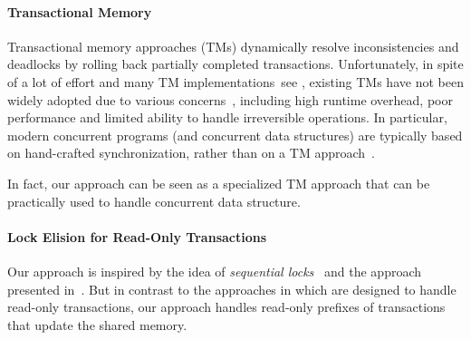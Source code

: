 \paragraph{Transactional Memory}
Transactional memory approaches (TMs) dynamically resolve inconsistencies
and deadlocks by rolling back partially completed transactions.
%
Unfortunately, in spite of a lot of effort and many TM implementations~see \cite{HLR:SLCA2010}, existing TMs
have not been widely adopted due to various concerns~\cite{DuffyTM2010,Cascaval:2008,mckenneyParallel}, including high runtime overhead,
poor performance and limited ability to handle irreversible operations.
In particular, modern concurrent programs (and concurrent data structures) are typically based on hand-crafted synchronization, rather than  on a TM approach~\cite{Ohad:OOPSLA11}.
 
In fact, our approach can be seen as a specialized TM approach that can be practically used to handle concurrent data structure.


\paragraph{Lock Elision for Read-Only Transactions}
Our approach is inspired by the idea of \emph{sequential locks}~\cite{mckenneyParallel} and the approach presented in~\cite{Nakaike:2010}.
But  in contrast to the approaches in \cite{mckenneyParallel,Nakaike:2010} which are designed to handle read-only transactions,
our approach handles read-only prefixes of transactions that update the shared memory.